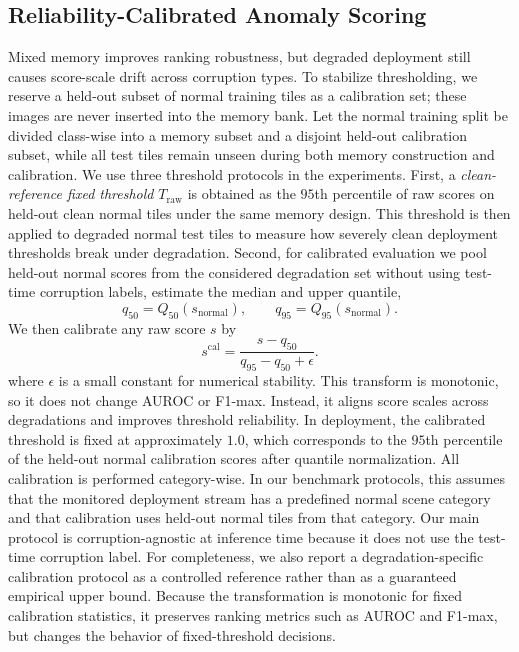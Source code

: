 \documentclass[remotesensing,article,submit,pdftex,moreauthors]{Definitions/mdpi}
\begin{document}
\subsection{Reliability-Calibrated Anomaly Scoring}
Mixed memory improves ranking robustness, but degraded deployment still causes score-scale drift across corruption types. To stabilize thresholding, we reserve a held-out subset of normal training tiles as a calibration set; these images are never inserted into the memory bank. Let the normal training split be divided class-wise into a memory subset and a disjoint held-out calibration subset, while all test tiles remain unseen during both memory construction and calibration. We use three threshold protocols in the experiments. First, a \emph{clean-reference fixed threshold} $T_{\text{raw}}$ is obtained as the $95$th percentile of raw scores on held-out clean normal tiles under the same memory design. This threshold is then applied to degraded normal test tiles to measure how severely clean deployment thresholds break under degradation. Second, for calibrated evaluation we pool held-out normal scores from the considered degradation set without using test-time corruption labels, estimate the median and upper quantile,
\begin{equation}
q_{50} = Q_{50}(s_{\text{normal}}), \qquad q_{95} = Q_{95}(s_{\text{normal}}).
\end{equation}
We then calibrate any raw score $s$ by
\begin{equation}
s^{\mathrm{cal}} = \frac{s - q_{50}}{q_{95} - q_{50} + \epsilon}.
\end{equation}
where $\epsilon$ is a small constant for numerical stability.
This transform is monotonic, so it does not change AUROC or F1-max. Instead, it aligns score scales across degradations and improves threshold reliability. In deployment, the calibrated threshold is fixed at approximately $1.0$, which corresponds to the $95$th percentile of the held-out normal calibration scores after quantile normalization. All calibration is performed category-wise. In our benchmark protocols, this assumes that the monitored deployment stream has a predefined normal scene category and that calibration uses held-out normal tiles from that category. Our main protocol is corruption-agnostic at inference time because it does not use the test-time corruption label. For completeness, we also report a degradation-specific calibration protocol as a controlled reference rather than as a guaranteed empirical upper bound.
Because the transformation is monotonic for fixed calibration statistics, it preserves ranking metrics such as AUROC and F1-max, but changes the behavior of fixed-threshold decisions.
\end{document}
